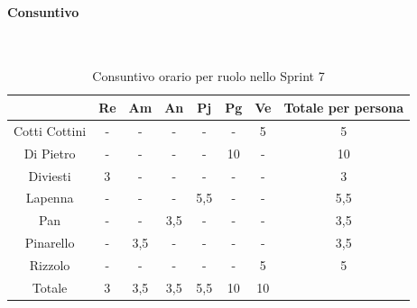 \documentclass{article}
\begin{document}
                \paragraph{Consuntivo}\mbox{}\\
                \begin{table}[H]
                    \centering
                    \begin{tabular}{|c|c|c|c|c|c|c|c|}
                    \hline
                                    & Re  & Am  & An  & Pj  & Pg  & Ve  & Totale per persona \\ \hline
                    Cotti Cottini & -   & -   & -   & -   & -   & 5   & 5                  \\ \hline
                    Di Pietro     & -   & -   & -   & -   & 10  & -   & 10                 \\ \hline
                    Diviesti      & 3   & -   & -   & -   & -   & -   & 3                  \\ \hline
                    Lapenna       & -   & -   & -   & 5,5 & -   & -   & 5,5                \\ \hline
                    Pan           & -   & -   & 3,5 & -   & -   & -   & 3,5                \\ \hline
                    Pinarello     & -   & 3,5 & -   & -   & -   & -   & 3,5                \\ \hline
                    Rizzolo       & -   & -   & -   & -   & -   & 5   & 5                  \\ \hline
                    Totale        & 3   & 3,5 & 3,5 & 5,5 & 10  & 10  &                    \\ \hline
                    \end{tabular}
                    \caption{Consuntivo orario per ruolo nello Sprint 7}
                \end{table}

\end{document}

